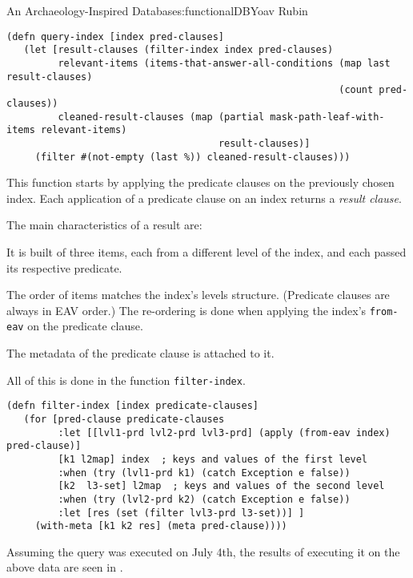 \begin{aosachapter}{An Archaeology-Inspired Database}{s:functionalDB}{Yoav Rubin}
\begin{verbatim}
(defn query-index [index pred-clauses]
   (let [result-clauses (filter-index index pred-clauses)
         relevant-items (items-that-answer-all-conditions (map last result-clauses) 
                                                          (count pred-clauses))
         cleaned-result-clauses (map (partial mask-path-leaf-with-items relevant-items)
                                     result-clauses)] 
     (filter #(not-empty (last %)) cleaned-result-clauses)))
\end{verbatim}

This function starts by applying the predicate clauses on the previously
chosen index. Each application of a predicate clause on an index returns
a \emph{result clause}.

The main characteristics of a result are:

\begin{aosaenumerate}
\def\labelenumi{\arabic{enumi}.}

\item
  It is built of three items, each from a different level of the index,
  and each passed its respective predicate.
\item
  The order of items matches the index's levels structure. (Predicate
  clauses are always in EAV order.) The re-ordering is done when
  applying the index's \texttt{from-eav} on the predicate clause.
\item
  The metadata of the predicate clause is attached to it.
\end{aosaenumerate}

All of this is done in the function \texttt{filter-index}.

\begin{verbatim}
(defn filter-index [index predicate-clauses]
   (for [pred-clause predicate-clauses
         :let [[lvl1-prd lvl2-prd lvl3-prd] (apply (from-eav index) pred-clause)] 
         [k1 l2map] index  ; keys and values of the first level
         :when (try (lvl1-prd k1) (catch Exception e false))  
         [k2  l3-set] l2map  ; keys and values of the second level
         :when (try (lvl2-prd k2) (catch Exception e false))
         :let [res (set (filter lvl3-prd l3-set))] ]
     (with-meta [k1 k2 res] (meta pred-clause))))
\end{verbatim}

Assuming the query was executed on July 4th, the results of executing it
on the above data are seen in
.


\end{aosachapter}

